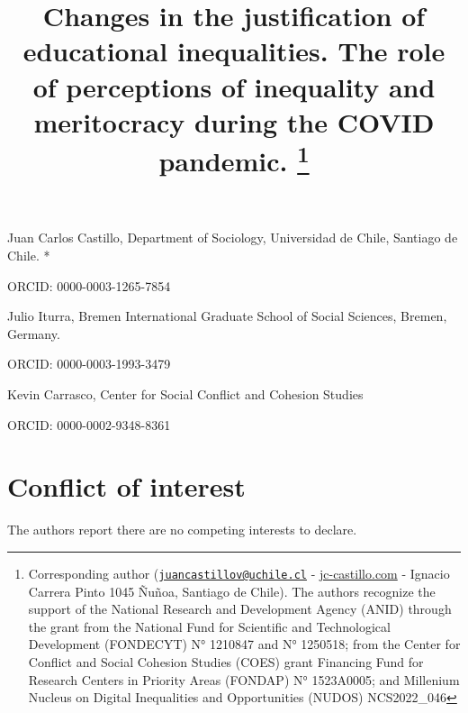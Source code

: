 \documentclass[
  12pt,
]{article}
\title{Changes in the justification of educational inequalities. The
role of perceptions of inequality and meritocracy during the COVID
pandemic. \footnote{Corresponding author
  (\href{mailto:juancastillov@uchile.cl}{\nolinkurl{juancastillov@uchile.cl}}
  -
  \href{https://juancarloscastillo.github.io/jc-castillo/}{jc-castillo.com}
  - Ignacio Carrera Pinto 1045 Ñuñoa, Santiago de Chile). The authors
  recognize the support of the National Research and Development Agency
  (ANID) through the grant from the National Fund for Scientific and
  Technological Development (FONDECYT) N° 1210847 and N° 1250518; from
  the Center for Conflict and Social Cohesion Studies (COES) grant
  Financing Fund for Research Centers in Priority Areas (FONDAP) N°
  1523A0005; and Millenium Nucleus on Digital Inequalities and
  Opportunities (NUDOS) NCS2022\_046}}
\author{}
\date{\vspace{-2.5em}}
\begin{document}
\maketitle

Juan Carlos Castillo, Department of Sociology, Universidad de Chile,
Santiago de Chile. *

ORCID: 0000-0003-1265-7854

Julio Iturra, Bremen International Graduate School of Social Sciences,
Bremen, Germany.

ORCID: 0000-0003-1993-3479

Kevin Carrasco, Center for Social Conflict and Cohesion Studies

ORCID: 0000-0002-9348-8361

\section{Conflict of interest}\label{conflict-of-interest}

The authors report there are no competing interests to declare.
\end{document}
